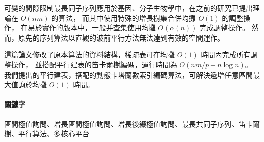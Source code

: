 \begin{abstractCH}

可變的間隙限制最長同子序列應用於基因、分子生物學中，在之前的研究已提出理論在 $O(nm)$ 的算法，
而其中使用特殊的增長樹集合併均攤 $O(1)$ 的調整操作，
在易於實作的版本中，一般并查集使用均攤 $O(\alpha(n))$ 完成調整操作。
然而，原先的序列算法以直觀的波前平行方法無法達到有效的空間運作。

\vspace{0.5em}

這篇論文修改了原本算法的資料結構，稀疏表可在均攤 $O(1)$ 時間內完成所有調整操作，
並搭配平行建表的笛卡爾樹編碼，運行時間為 $O(nm / p + n \log n)$。
我們提出的平行建表，搭配的動態卡塔蘭數索引編碼算法，可解決遞增任意區間最大值詢於均攤 $O(1)$ 時間。

\paragraph{關鍵字} 
區間極值詢問、增長區間極值詢問、增長後綴極值詢問、最長共同子序列、笛卡爾樹、平行算法、多核心平台

\end{abstractCH}
